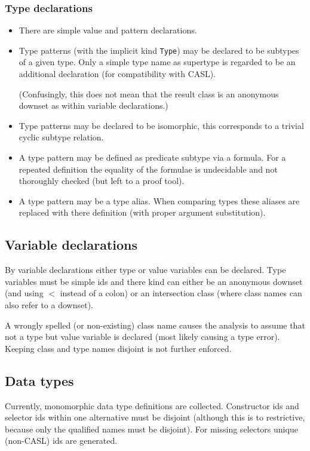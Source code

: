 \documentclass{article}
\begin{document}
\subsubsection*{Type declarations}

\begin{itemize}
\item There are simple value and pattern declarations. 
\item Type patterns (with the implicit kind \texttt{Type})
  may be declared to be subtypes of a given type. Only a simple type name as
  supertype is regarded to be an additional declaration (for compatibility
  with CASL).
  
  (Confusingly, this does not mean that the result class is an anonymous
  downset as within variable declarations.)
\item Type patterns may be declared to be isomorphic, this corresponds to a
  trivial cyclic subtype relation.
\item A type pattern may be defined as predicate subtype via a
  formula. For a repeated definition the equality of the formulae is
  undecidable and not thoroughly checked (but left to a proof tool).  
\item A type pattern may be a type alias. When comparing types these aliases
  are replaced with there definition (with proper argument substitution). 
\end{itemize}

\subsection{Variable declarations}

By variable declarations either type or value variables can be declared.
Type variables must be simple ids and there kind can either be an anonymous
downset (and using $<$ instead of a colon) or an intersection class (where
class names can also refer to a downset).

A wrongly spelled (or non-existing) class name causes the analysis to assume
that not a type but value variable is declared (most likely causing a type
error). Keeping class and type names disjoint is not further enforced.

\subsection{Data types}

Currently, monomorphic data type definitions are collected. Constructor ids
and selector ids within one alternative must be disjoint (although this is to
restrictive, because only the qualified names must be disjoint). For missing
selectors unique (non-CASL) ids are generated. 
\end{document}
